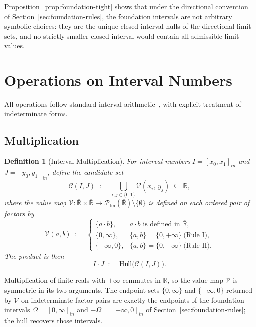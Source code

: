 \documentclass[11pt,a4paper]{article}
\theoremstyle{paperdef}
\newtheorem{definition}[theorem]{Definition}
\newcommand{\Rext}{\overline{\mathbb{R}}}
\newcommand{\inI}[1]{[#1]_{in}}
\newcommand{\V}{\mathcal{V}}
\newcommand{\Cand}{\mathcal{C}}
\begin{document}
Proposition~\ref{prop:foundation-tight} shows that under the
directional convention of Section~\ref{sec:foundation-rules}, the
foundation intervals are not arbitrary symbolic choices: they are the
unique closed-interval hulls of the directional limit sets, and no
strictly smaller closed interval would contain all admissible limit
values.

\section{Operations on Interval Numbers}\label{sec:operations}

All operations follow standard interval arithmetic~\cite{Moore1966},
with explicit treatment of indeterminate forms.

\subsection{Multiplication}\label{sec:multiplication}

\begin{definition}[Interval Multiplication]\label{def:multiplication}
For interval numbers $I = \inI{x_0, x_1}$ and $J = \inI{y_0, y_1}$,
define the \emph{candidate set}
\[
\Cand(I, J) \;:=\; \bigcup_{i,j \in \{0,1\}} \V(x_i,\, y_j)
\;\subseteq\; \Rext,
\]
where the \emph{value map} $\V : \Rext \times \Rext \to
\mathcal{P}_{\mathrm{fin}}(\Rext) \setminus \{\emptyset\}$ is defined
on each ordered pair of factors by
\[
\V(a, b) \;:=\;
\begin{cases}
\{a \cdot b\}, & a \cdot b \text{ is defined in $\Rext$}, \\
\{0, \infty\},  & \{a, b\} = \{0, +\infty\}\ \text{(Rule~I)}, \\
\{-\infty, 0\}, & \{a, b\} = \{0, -\infty\}\ \text{(Rule~II)}.
\end{cases}
\]
The product is then
\[
I \cdot J \;:=\; \mathrm{Hull}\bigl(\Cand(I, J)\bigr).
\]
\end{definition}

Multiplication of finite reals with $\pm\infty$ commutes in $\Rext$,
so the value map $\V$ is symmetric in its two arguments. The endpoint
sets $\{0, \infty\}$ and $\{-\infty, 0\}$ returned by $\V$ on
indeterminate factor pairs are exactly the endpoints of the foundation
intervals $\Omega = \inI{0, \infty}$ and $-\Omega = \inI{-\infty, 0}$
of Section~\ref{sec:foundation-rules}; the hull recovers those
intervals.
\end{document}
